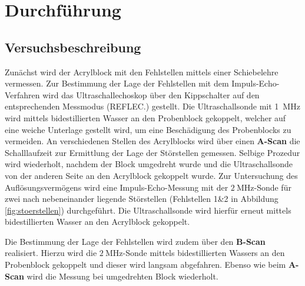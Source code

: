 \section{Durchführung}
\label{sec:Durchführung}



\subsection{Versuchsbeschreibung}
\label{sec:Versuchsbeschreibung}
Zunächst wird der Acrylblock mit den Fehlstellen mittels einer Schiebelehre vermessen.
Zur Bestimmung der Lage der Fehlstellen mit dem Impuls-Echo-Verfahren wird das Ultraschallechoskop über den Kippschalter auf den entsprechenden Messmodus (REFLEC.) gestellt.
Die Ultraschallsonde mit \SI{1}{\mega\Hz} wird mittels bidestillierten Wasser an den Probenblock gekoppelt, welcher auf eine weiche Unterlage gestellt wird, um eine Beschädigung des Probenblocks zu vermeiden.
An verschiedenen Stellen des Acrylblocks wird über einen \textbf{A-Scan} die Schalllaufzeit zur Ermittlung der Lage der Störstellen gemessen. Selbige Prozedur wird wiederholt, nachdem der Block umgedreht wurde und die Ultraschallsonde von der anderen Seite an den Acrylblock gekoppelt wurde.
Zur Untersuchung des Auflösungsvermögens wird eine Impuls-Echo-Messung mit der $\SI{2}{\mega\Hz}$-Sonde für zwei nach nebeneinander liegende Störstellen (Fehlstellen 1&2 in Abbildung \ref{fig:stoerstellen}) durchgeführt.
Die Ultraschallsonde wird hierfür erneut mittels bidestillierten Wasser an den Acrylblock gekoppelt.

Die Bestimmung der Lage der Fehlstellen wird zudem über den \textbf{B-Scan} realisiert. Hierzu wird die $\SI{2}{\mega\Hz}$-Sonde mittels bidestillierten Wassers an den Probenblock gekoppelt und dieser wird langsam abgefahren.
Ebenso wie beim \textbf{A-Scan} wird die Messung bei umgedrehten Block wiederholt.
